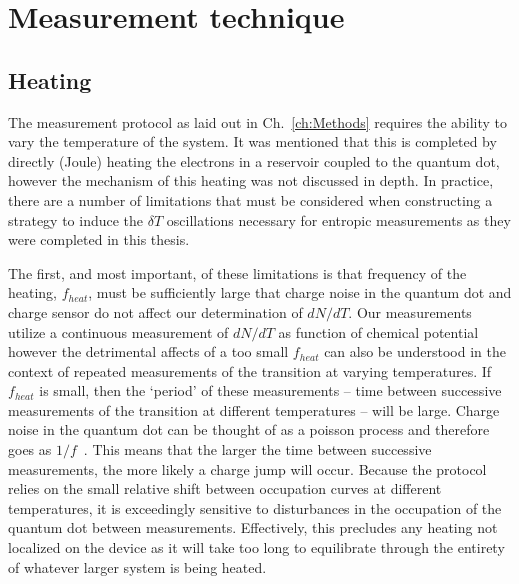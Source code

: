 \chapter{Measurement technique}
\section{Heating}
\label{sec:heating}

The measurement protocol as laid out in Ch.~\ref{ch:Methods} requires the ability to vary the temperature of the system. It was mentioned that this is completed by directly (Joule) heating the electrons in a reservoir coupled to the quantum dot, however the mechanism of this heating was not discussed in depth. In practice, there are a number of limitations that must be considered when constructing a strategy to induce the $\delta T$ oscillations necessary for entropic measurements as they were completed in this thesis. 

The first, and most important, of these limitations is that frequency of the heating, $f_{heat}$, must be sufficiently large that charge noise in the quantum dot and charge sensor do not affect our determination of $dN/dT$. Our measurements utilize a continuous measurement of $dN/dT$ as function of chemical potential however the detrimental affects of a too small $f_{heat}$ can also be understood in the context of repeated measurements of the transition at varying temperatures. If $f_{heat}$ is small, then the `period' of these measurements -- time between successive measurements of the transition at different temperatures -- will be large. Charge noise in the quantum dot can be thought of as a poisson process and therefore goes as $1/f$~\cite{fujisawa2000charge}. This means that the larger the time between successive measurements, the more likely a charge jump will occur. Because the protocol relies on the small relative shift between occupation curves at different temperatures, it is exceedingly sensitive to disturbances in the occupation of the quantum dot between measurements. Effectively, this precludes any heating not localized on the device as it will take too long to equilibrate through the entirety of whatever larger system is being heated. 

